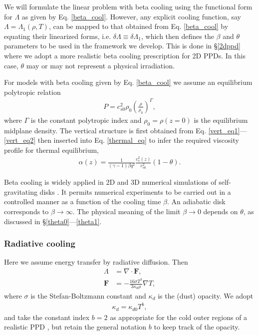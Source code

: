 We will formulate the linear problem with beta cooling using the
functional form for $\Lambda$ as given by
Eq. \ref{beta_cool}. However, any explicit cooling function, say
$\Lambda=\Lambda_1(\rho,T)$, can be mapped to that obtained from
Eq. \ref{beta_cool} by equating their linearized forms, i.e. $\delta
\Lambda \equiv \delta \Lambda_1$, which then defines the $\beta$ and
$\theta$ parameters to be used in the framework we develop. This is
done in \S\ref{2dppd} where we adopt a more realistic beta cooling 
prescription for 2D PPDs. In this case, $\theta$ may or may not
represent a physical irradiation.     

For models with beta cooling given by Eq. \ref{beta_cool} we assume an 
equilibrium polytropic relation 
\begin{align} 
  P  =
c_{s0}^2\rho_0\left(\frac{\rho}{\rho_0}\right)^\Gamma,
\end{align}
where $\Gamma$ is the constant polytropic index and $\rho_0 =
\rho(z=0)$ is the equilibrium midplane density. 
The vertical structure is first obtained from
Eq. \ref{vert_eq1}---\ref{vert_eq2} then inserted into
Eq. \ref{thermal_eq} to infer the required viscosity profile for
thermal equilibrium,   
\begin{align}\label{alpha_beta_relation}
\alpha(z) = \frac{1}{(\gamma-1)\beta
   q^2}\frac{c_s^2(z)}{c_{s0}^2}\left(1 - \theta\right). 
\end{align}

Beta cooling is widely applied in 2D and 3D
numerical simulations of self-gravitating disks \citep{gammie01,
  rice05,baehr15}. It permits numerical experiments to be carried out in a
controlled manner as a function of the cooling time $\beta$. An
adiabatic disk corresponds to $\beta\to \infty$. The
physical meaning of the limit $\beta\to0$ depends on $\theta$, as
discussed in \S\ref{theta0}---\ref{theta1}.  

\subsubsection{Radiative cooling}\label{rad_cool}
Here we assume energy transfer by radiative diffusion. Then
\begin{align}
  \Lambda &= \nabla\cdot\bm{F},\label{rad_cool1}\\
  \bm{F}   &= -\frac{16\sigma T^3}{3\kappa_d\rho}\nabla T, \label{rad_cool2}
\end{align}
where $\sigma$ is the Stefan-Boltzmann constant and 
$\kappa_d$ is the (dust) opacity. We adopt
\begin{align}\label{opacity_law}
  \kappa_d = \kappa_{d0}T^b,
\end{align}
and take the constant index $b=2$ as appropriate for the cold outer regions
of a realistic PPD \citep{bell94}, but retain the general notation $b$
to keep track of the opacity.    

